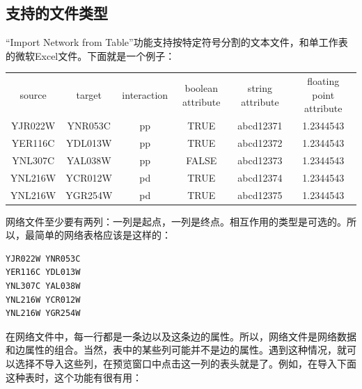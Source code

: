 \subsection{支持的文件类型}
``Import Network from Table''功能支持按特定符号分割的文本文件，和单工作表的微软Excel文件。下面就是一个例子：

\medskip

{\center\tiny
\begin{tabular}{cccccc}
source  &target&  interaction&  boolean attribute&  string attribute&        floating point attribute\\
YJR022W &YNR053C &pp     & TRUE  &  abcd12371    &   1.2344543\\
YER116C &YDL013W &pp     & TRUE   & abcd12372    &   1.2344543\\
YNL307C &YAL038W &pp     & FALSE  & abcd12373    &   1.2344543\\
YNL216W &YCR012W &pd     & TRUE   & abcd12374    &   1.2344543\\
YNL216W &YGR254W &pd     & TRUE   & abcd12375    &   1.2344543
\end{tabular}}


网络文件至少要有两列：一列是起点，一列是终点。相互作用的类型是可选的。所以，最简单的网络表格应该是这样的：

\begin{verbatim}
YJR022W YNR053C
YER116C YDL013W
YNL307C YAL038W
YNL216W YCR012W
YNL216W YGR254W
\end{verbatim}

在网络文件中，每一行都是一条边以及这条边的属性。所以，网络文件是网络数据和边属性的组合。当然，表中的某些列可能并不是边的属性。遇到这种情况，就可以选择不导入这些列，在预览窗口中点击这一列的表头就是了。例如，在导入下面这种表时，这个功能有很有用：

